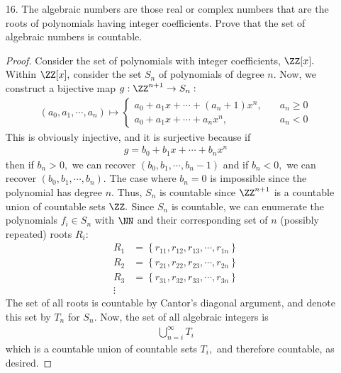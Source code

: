 \documentclass{article}
\begin{document}
\begin{itemize}
	\item[16.] The algebraic numbers are those real or complex numbers that are the roots of polynomials having integer coefficients. Prove that the set of algebraic numbers is countable.
		\begin{proof}
			Consider the set of polynomials with integer coefficients, $\ZZ[x].$ Within $\ZZ[x],$ consider the set $S_n$ of polynomials of degree $n.$ Now, we construct a bijective map $g:\ZZ^{n+1}\to S_n:$
			\begin{align*}
				(a_0, a_1, \cdots, a_n) \mapsto \begin{cases}
					a_0 + a_1x + \cdots + (a_n+1) x^n, \quad &a_n\ge 0 \\
					a_0+a_1x+\cdots+a_n x^n, \quad\quad &a_n<0	
				\end{cases}
			\end{align*}
			This is obviously injective, and it is surjective because if
			\begin{align*}
				g=b_0+b_1x+\cdots+b_n x^n
			\end{align*}
			then if $b_n>0,$ we can recover $(b_0, b_1, \cdots, b_n-1)$ and if $b_n<0,$ we can recover $(b_0, b_1, \cdots, b_n).$ The case where $b_n=0$ is impossible since the polynomial has degree $n.$ Thus, $S_n$ is countable since $\ZZ^{n+1}$ is a countable union of countable sets $\ZZ.$ Since $S_n$ is countable, we can enumerate the polynomials $f_i\in S_n$ with $\NN$ and their corresponding set of $n$ (possibly repeated) roots $R_i$:
			\begin{align*}
				R_1 &= \left\{ r_{11}, r_{12}, r_{13}, \cdots, r_{1n} \right\} \\
				R_2 &= \left\{ r_{21}, r_{22}, r_{23}, \cdots, r_{2n} \right\} \\
				R_3 &= \left\{ r_{31}, r_{32}, r_{33}, \cdots, r_{3n} \right\} \\
				\vdots
			\end{align*}
			The set of all roots is countable by Cantor's diagonal argument, and denote this set by $T_n$ for $S_n.$ Now, the set of all algebraic integers is
			\begin{align*}
				\bigcup_{n=i}^\infty T_i
			\end{align*}
			which is a countable union of countable sets $T_i,$ and therefore countable, as desired.
		\end{proof}


\end{itemize}
\end{document}
